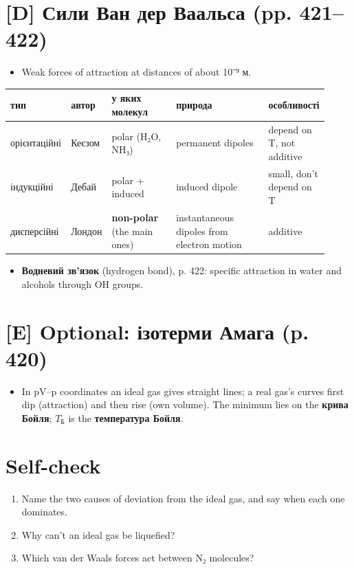 \documentclass[11pt,a4paper,oneside]{book}
\begin{document}
\section*{[D] Сили Ван дер Ваальса (pp. 421–422)}
\begin{itemize}
\item Weak forces of attraction at distances of about 10⁻⁹ м.
\end{itemize}
{\footnotesize
\begin{longtable}{>{\raggedright\arraybackslash}p{0.138\linewidth}>{\raggedright\arraybackslash}p{0.069\linewidth}>{\raggedright\arraybackslash}p{0.219\linewidth}>{\raggedright\arraybackslash}p{0.305\linewidth}>{\raggedright\arraybackslash}p{0.188\linewidth}}
\toprule
\textbf{тип} & \textbf{автор} & \textbf{у яких молекул} & \textbf{природа} & \textbf{особливості} \\
\midrule
\endhead
орієнтаційні & Кеєзом & polar (H₂O, NH₃) & permanent dipoles & depend on T, not additive \\
індукційні & Дебай & polar + induced & induced dipole & small, don't depend on T \\
дисперсійні & Лондон & \textbf{non-polar} (the main ones) & instantaneous dipoles from electron motion & additive \\
\bottomrule
\end{longtable}
}
\begin{itemize}
\item \textbf{Водневий зв'язок} (hydrogen bond), p. 422: specific attraction in water and alcohols through OH groups.
\end{itemize}

\section*{[E] Optional: ізотерми Амага (p. 420)}
\begin{itemize}
\item In pV–p coordinates an ideal gas gives straight lines; a real gas's curves first dip (attraction) and then rise (own volume). The minimum lies on the \textbf{крива Бойля}; $T_{\text{Б}}$ is the \textbf{температура Бойля}.
\end{itemize}

\section*{Self-check}
\begin{enumerate}
\item Name the two causes of deviation from the ideal gas, and say when each one dominates.
\item Why can't an ideal gas be liquefied?
\item Which van der Waals forces act between N₂ molecules?
\end{enumerate}
\end{document}
